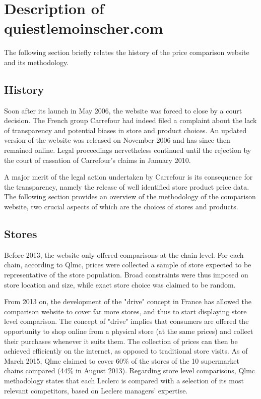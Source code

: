 \documentclass[11pt]{article}
\begin{document}
\section{Description of quiestlemoinscher.com}

The following section briefly relates the history of the price comparison website and its methodology.

\subsection{History}

Soon after its launch in May 2006, the website was forced to close by a court decision. The French group Carrefour had indeed filed a complaint about the lack of transparency and potential biases in store and product choices. An updated version of the website was released on November 2006 and has since then remained online. Legal proceedings nervetheless continued until the rejection by the court of cassation of Carrefour's claims in January 2010.

A major merit of the legal action undertaken by Carrefour is its consequence for the transparency, namely the release of well identified store product price data. The following section provides an overview of the methodology of the comparison website, two crucial aspects of which are the choices of stores and products.

\subsection{Stores}

Before 2013, the website only offered comparisons at the chain level. For each chain, according to Qlmc, prices were collected a sample of store expected to be representative of the store population. Broad constraints were thus imposed on store location and size, while exact store choice was claimed to be random.

From 2013 on, the development of the "drive" concept in France has allowed the comparison website to cover far more stores, and thus to start displaying store level comparison. The concept of "drive" implies that consumers are offered the opportunity to shop online from a physical store (at the same prices) and collect their purchases whenever it suits them. The collection of prices can then be achieved efficiently on the internet, as opposed to traditional store visits. As of March 2015, Qlmc claimed to cover 60\% of the stores of the 10 supermarket chains compared (44\% in August 2013). Regarding store level comparisons, Qlmc  methodology states that each Leclerc is compared with a selection of its most relevant competitors, based on Leclerc managers' expertise.
\end{document}
